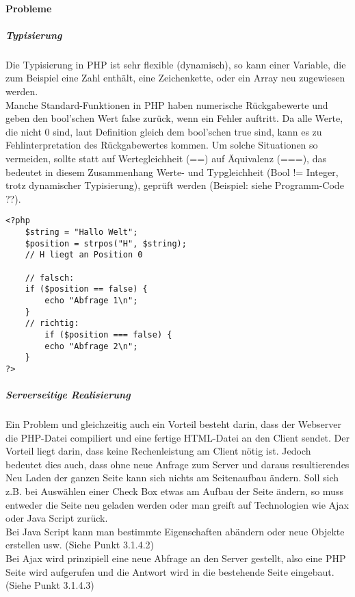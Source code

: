 \paragraph{Probleme}
\subparagraph{Typisierung} 
Die Typisierung in PHP ist sehr flexible (dynamisch), so kann einer Variable, die zum Beispiel eine Zahl enthält, eine Zeichenkette, oder ein Array neu zugewiesen werden.\\
Manche Standard-Funktionen in PHP haben numerische Rückgabewerte und geben den bool'schen Wert false zurück, wenn ein Fehler auftritt. Da alle Werte, die nicht 0 sind, laut Definition gleich dem bool'schen true sind, kann es zu Fehlinterpretation des Rückgabewertes kommen. Um solche Situationen so vermeiden, sollte statt auf Wertegleichheit (==) auf Äquivalenz (===), das bedeutet in diesem Zusammenhang Werte- und Typgleichheit (Bool != Integer, trotz dynamischer Typisierung), geprüft werden (Beispiel: siehe Programm-Code ??).
\begin{lstlisting}[style=customPHP, caption={false}]
<?php 
	$string = "Hallo Welt";
	$position = strpos("H", $string); 
	// H liegt an Position 0
	
	// falsch:
	if ($position == false) {
		echo "Abfrage 1\n";
	}
	// richtig:
		if ($position === false) {
		echo "Abfrage 2\n";
	}
?>
\end{lstlisting}
\subparagraph{Serverseitige Realisierung}
Ein Problem und gleichzeitig auch ein Vorteil besteht darin, dass der Webserver die PHP-Datei compiliert und eine fertige HTML-Datei an den Client sendet. Der Vorteil liegt darin, dass keine Rechenleistung am Client nötig ist. Jedoch bedeutet dies auch, dass ohne neue Anfrage zum Server und daraus resultierendes Neu Laden der ganzen Seite kann sich nichts am Seitenaufbau ändern. Soll sich z.B. bei Auswählen einer Check Box etwas am Aufbau der Seite ändern, so muss entweder die Seite neu geladen werden oder man greift auf Technologien wie Ajax oder Java Script zurück.\\
Bei Java Script kann man bestimmte Eigenschaften abändern oder neue Objekte erstellen usw. (Siehe Punkt 3.1.4.2)\\
Bei Ajax wird prinzipiell eine neue Abfrage an den Server gestellt, also eine PHP Seite wird aufgerufen und die Antwort wird in die bestehende Seite eingebaut. (Siehe Punkt 3.1.4.3)\\